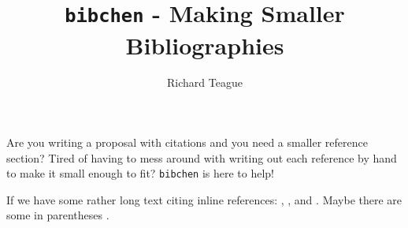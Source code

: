 \documentclass[a4paper, 12pt]{article}
\title{\texttt{bibchen} - Making Smaller Bibliographies}
\author{Richard Teague}
\begin{document}
\maketitle{}

Are you writing a proposal with citations and you need a smaller reference
section? Tired of having to mess around with writing out each reference by hand
to make it small enough to fit? \texttt{bibchen} is here to help!

If we have some rather long text citing inline references:
\citet{Teague_Foreman-Mackey_2018}, \citet{Teague_ea_2018}, and
\citet{Teague_ea_2017}. Maybe there are some in parentheses
\citep{Teague_ea_2016, Teague_ea_2015}.


{}
\end{document}
